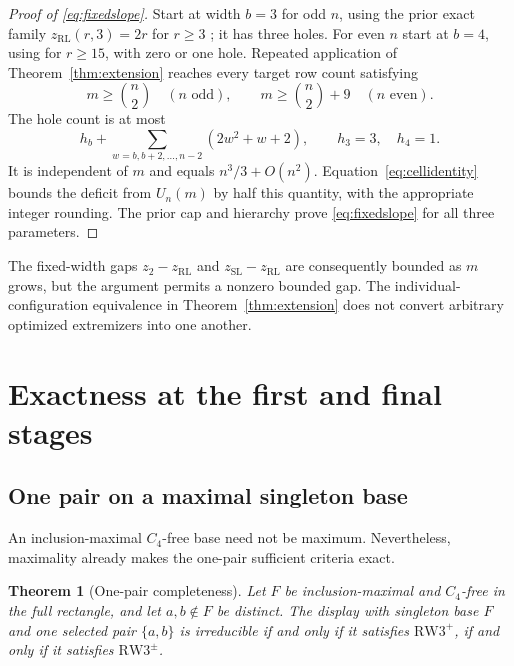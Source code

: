 \documentclass[11pt,a4paper]{article}
\newtheorem{theorem}{Theorem}[section]
\theoremstyle{definition}
\newcommand{\zr}{z_{\mathrm{RL}}}
\newcommand{\zs}{z_{\mathrm{SL}}}
\newcommand{\zt}{z_2}
\newcommand{\RW}{\mathrm{RW3}^{+}}
\newcommand{\SG}{\mathrm{RW3}^{\pm}}
\begin{document}
\begin{proof}[Proof of \eqref{eq:fixedslope}]
Start at width $b=3$ for odd $n$, using the prior exact family
$\zr(r,3)=2r$ for $r\ge3$ \cite{LQ}; it has three holes.
For even $n$ start at $b=4$, using \cite{CC} for $r\ge15$, with
zero or one hole. Repeated application of Theorem~\ref{thm:extension}
reaches every target row count satisfying
\[
 m\ge\binom n2\quad(n\text{ odd}),\qquad
 m\ge\binom n2+9\quad(n\text{ even}).
\]
The hole count is at most
\begin{equation}\label{eq:holepolynomial}
 h_b+\sum_{w=b,b+2,\ldots,n-2}(2w^2+w+2),
 \qquad h_3=3,\quad h_4=1.
\end{equation}
It is independent of $m$ and equals $n^3/3+O(n^2)$.
Equation~\eqref{eq:cellidentity} bounds the deficit from $U_n(m)$ by
half this quantity, with the appropriate integer rounding. The prior
cap and hierarchy prove \eqref{eq:fixedslope} for all three parameters.
\end{proof}

The fixed-width gaps $\zt-\zr$ and $\zs-\zr$ are consequently bounded
as $m$ grows, but the argument permits a nonzero bounded gap. The
individual-configuration equivalence in Theorem~\ref{thm:extension}
does not convert arbitrary optimized extremizers into one another.


\section{Exactness at the first and final stages}\subsection{One pair on a maximal singleton base}\label{sec:unary}

An inclusion-maximal $C_4$-free base need not be maximum. Nevertheless,
maximality already makes the one-pair sufficient criteria exact.

\begin{theorem}[One-pair completeness]\label{thm:unary}
Let $F$ be inclusion-maximal and $C_4$-free in the full rectangle, and
let $a,b\notin F$ be distinct. The display with singleton base $F$ and
one selected pair $\{a,b\}$ is irreducible if and only if it satisfies
$\RW$, if and only if it satisfies $\SG$.
\end{theorem}
\end{document}
